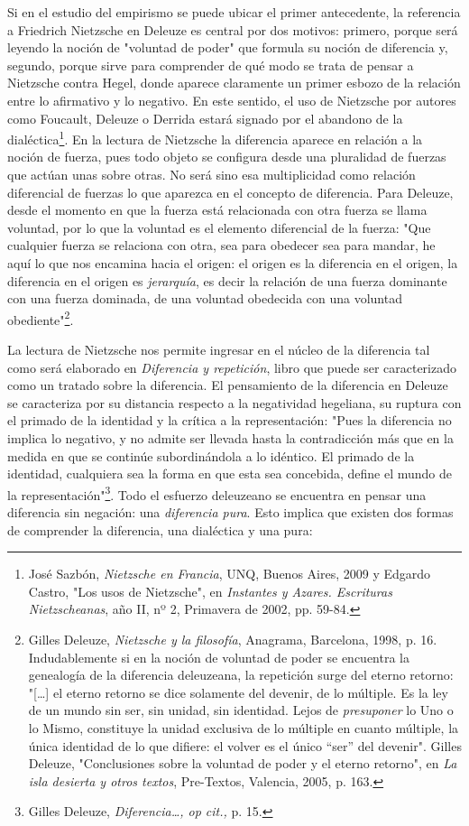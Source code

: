 \documentclass{book}
\begin{document}
Si en el estudio del empirismo se puede ubicar el primer antecedente, la
referencia a Friedrich Nietzsche en Deleuze es central por dos motivos:
primero, porque será leyendo la noción de "voluntad de poder" que
formula su noción de diferencia y, segundo, porque sirve para comprender
de qué modo se trata de pensar a Nietzsche contra Hegel, donde aparece
claramente un primer esbozo de la relación entre lo afirmativo y lo
negativo. En este sentido, el uso de Nietzsche por autores como
Foucault, Deleuze o Derrida estará signado por el abandono de la
dialéctica\footnote{José Sazbón, \emph{Nietzsche en Francia}, UNQ,
  Buenos Aires, 2009 y Edgardo Castro, "Los usos de Nietzsche", en
  \emph{Instantes y Azares. Escrituras Nietzscheanas}, año II, nº 2,
  Primavera de 2002, pp. 59-84.}. En la lectura de Nietzsche la
diferencia aparece en relación a la noción de fuerza, pues todo objeto
se configura desde una pluralidad de fuerzas que actúan unas sobre
otras. No será sino esa multiplicidad como relación diferencial de
fuerzas lo que aparezca en el concepto de diferencia. Para Deleuze,
desde el momento en que la fuerza está relacionada con otra fuerza se
llama voluntad, por lo que la voluntad es el elemento diferencial de la
fuerza: "Que cualquier fuerza se relaciona con otra, sea para obedecer
sea para mandar, he aquí lo que nos encamina hacia el origen: el origen
es la diferencia en el origen, la diferencia en el origen es
\emph{jerarquía}, es decir la relación de una fuerza dominante con una
fuerza dominada, de una voluntad obedecida con una voluntad
obediente"\footnote{Gilles Deleuze, \emph{Nietzsche y la filosofía},
  Anagrama, Barcelona, 1998, p. 16. Indudablemente si en la noción de
  voluntad de poder se encuentra la genealogía de la diferencia
  deleuzeana, la repetición surge del eterno retorno: "{[}\ldots{]} el
  eterno retorno se dice solamente del devenir, de lo múltiple. Es la
  ley de un mundo sin ser, sin unidad, sin identidad. Lejos de
  \emph{presuponer} lo Uno o lo Mismo, constituye la unidad exclusiva de
  lo múltiple en cuanto múltiple, la única identidad de lo que difiere:
  el volver es el único ``ser'' del devenir". Gilles Deleuze,
  "Conclusiones sobre la voluntad de poder y el eterno retorno", en
  \emph{La isla desierta y otros textos}, Pre-Textos, Valencia, 2005, p.
  163.}.

La lectura de Nietzsche nos permite ingresar en el núcleo de la
diferencia tal como será elaborado en \emph{Diferencia y repetición},
libro que puede ser caracterizado como un tratado sobre la diferencia.
El pensamiento de la diferencia en Deleuze se caracteriza por su
distancia respecto a la negatividad hegeliana, su ruptura con el primado
de la identidad y la crítica a la representación: "Pues la diferencia no
implica lo negativo, y no admite ser llevada hasta la contradicción más
que en la medida en que se continúe subordinándola a lo idéntico. El
primado de la identidad, cualquiera sea la forma en que esta sea
concebida, define el mundo de la representación"\footnote{Gilles
  Deleuze, \emph{Diferencia\ldots, op cit.,} p. 15.}. Todo el esfuerzo
deleuzeano se encuentra en pensar una diferencia sin negación: una
\emph{diferencia pura}. Esto implica que existen dos formas de
comprender la diferencia, una dialéctica y una pura:
\end{document}
